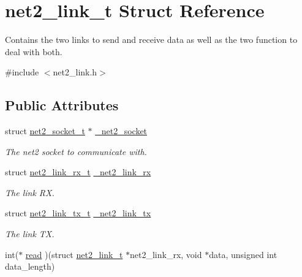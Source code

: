 \hypertarget{structnet2__link__t}{\section{net2\-\_\-link\-\_\-t Struct Reference}
\label{structnet2__link__t}
}


Contains the two links to send and receive data as well as the two function to deal with both.  




{\ttfamily \#include $<$net2\-\_\-link.\-h$>$}

\subsection*{Public Attributes}
\begin{DoxyCompactItemize}
\item 
\hypertarget{structnet2__link__t_a8f65f2ed0fbce1980d459461be98b761}{struct \hyperlink{structnet2__socket__t}{net2\-\_\-socket\-\_\-t} $\ast$ \hyperlink{structnet2__link__t_a8f65f2ed0fbce1980d459461be98b761}{\-\_\-net2\-\_\-socket}}\label{structnet2__link__t_a8f65f2ed0fbce1980d459461be98b761}

\begin{DoxyCompactList}\small\item\em The net2 socket to communicate with. \end{DoxyCompactList}\item 
\hypertarget{structnet2__link__t_ad80d872bae84888fec67048269d55a4b}{struct \hyperlink{structnet2__link__rx__t}{net2\-\_\-link\-\_\-rx\-\_\-t} \hyperlink{structnet2__link__t_ad80d872bae84888fec67048269d55a4b}{\-\_\-net2\-\_\-link\-\_\-rx}}\label{structnet2__link__t_ad80d872bae84888fec67048269d55a4b}

\begin{DoxyCompactList}\small\item\em The link R\-X. \end{DoxyCompactList}\item 
\hypertarget{structnet2__link__t_a4c167a94d5b5be0e8ecd8d719ba72bcd}{struct \hyperlink{structnet2__link__tx__t}{net2\-\_\-link\-\_\-tx\-\_\-t} \hyperlink{structnet2__link__t_a4c167a94d5b5be0e8ecd8d719ba72bcd}{\-\_\-net2\-\_\-link\-\_\-tx}}\label{structnet2__link__t_a4c167a94d5b5be0e8ecd8d719ba72bcd}

\begin{DoxyCompactList}\small\item\em The link T\-X. \end{DoxyCompactList}\item 
\hypertarget{structnet2__link__t_a4a95768a698152d1be5dc2b416581a49}{int($\ast$ \hyperlink{structnet2__link__t_a4a95768a698152d1be5dc2b416581a49}{read} )(struct \hyperlink{structnet2__link__t}{net2\-\_\-link\-\_\-t} $\ast$net2\-\_\-link\-\_\-rx, void $\ast$data, unsigned int data\-\_\-length)}\label{structnet2__link__t_a4a95768a698152d1be5dc2b416581a49}


\end{DoxyCompactItemize}
